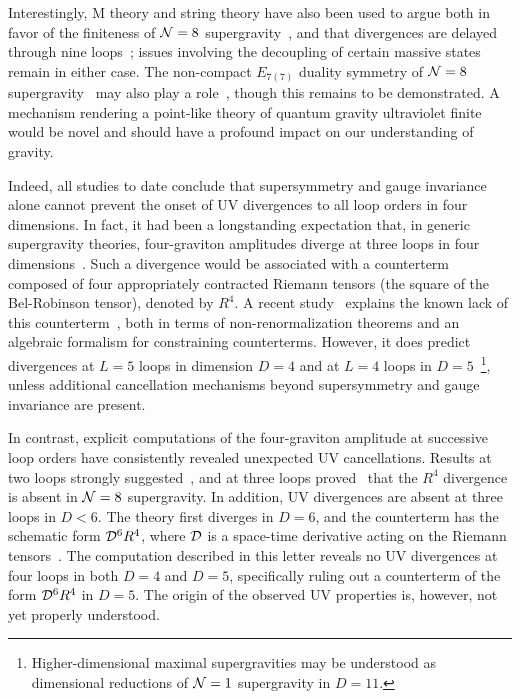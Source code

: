 \documentclass[aps,prl,twocolumn,groupedaddress,draft,showpacs,nofootinbib]{revtex4}
\def\NeqOne{{{\cal N}=1}}
\def\NeqEight{{{\cal N}=8}}
\begin{document}
Interestingly, M theory and string theory have also been used to argue
both in favor of the finiteness of $\NeqEight$
supergravity~\cite{DualityArguments}, and that divergences are delayed
through nine loops~\cite{Berkovits,GreenII}; issues involving the
decoupling of certain massive states~\cite{GOS} remain in either
case.  The non-compact $E_{7(7)}$ duality symmetry 
of $\NeqEight$ supergravity~\cite{CremmerJulia,E7Recent}
may also play a role~\cite{Simplest,KalloshLightCone},
though this remains to be demonstrated.
A mechanism rendering a point-like theory of quantum gravity
ultraviolet finite would be novel and should have a profound impact on
our understanding of gravity.

Indeed, all studies to date conclude that supersymmetry and gauge
invariance alone cannot prevent the onset of UV divergences to all
loop orders in four dimensions. In fact, it had been a longstanding
expectation that, in generic supergravity theories, four-graviton
amplitudes diverge at three loops in four
dimensions~\cite{Supergravity}.  Such a divergence would be associated
with a counterterm composed of four appropriately contracted Riemann
tensors (the square of the Bel-Robinson tensor), denoted by $R^4$.  A
recent study~\cite{HoweStelleRecent} explains the known lack of this
counterterm~\cite{GravityThree,CompactThree}, both in terms of
non-renormalization theorems and an algebraic formalism for
constraining counterterms.  However, it does predict divergences 
at $L=5$ loops in dimension $D=4$ and at $L=4$ loops in
$D=5$~\footnote{Higher-dimensional maximal supergravities
may be understood as dimensional reductions of $\NeqOne$ supergravity
in $D = 11$.}, unless additional cancellation mechanisms beyond
supersymmetry and gauge invariance are present.

In contrast, explicit computations of the four-graviton amplitude at
successive loop orders have consistently revealed unexpected UV
cancellations.  Results at two loops strongly suggested~\cite{BDDPR},
and at three loops proved~\cite{GravityThree,CompactThree} that the
$R^4$ divergence is absent in $\NeqEight$ supergravity. In addition,
UV divergences are absent at three loops in $D<6$.  The theory
first diverges in $D=6$, and the counterterm has the schematic form 
${\cal D}^6 R^4$, where ${\cal D}$ is a space-time derivative
acting on the Riemann tensors~\cite{CompactThree}.
The computation described in this letter reveals no UV divergences 
at four loops in both $D=4$ and $D=5$, specifically ruling out
a counterterm of the form ${\cal D}^6 R^4$ in $D=5$.
The origin of the observed UV properties is, however, not yet
properly understood.  
\end{document}

